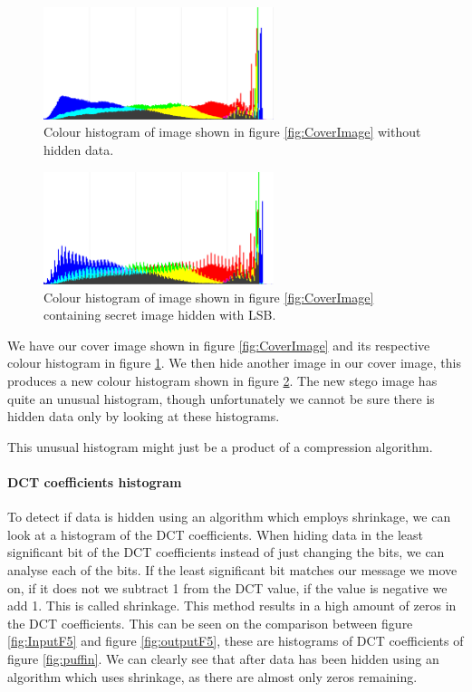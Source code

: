 \begin{figure}
	\centering
	\includegraphics[width=0.6\textwidth]{figures/HistoLSBCat.png}
	\caption{Colour histogram of image shown in figure \ref{fig:CoverImage} without hidden data.}
	\label{fig:HistoWithoutLSB}
\end{figure}

\begin{figure}
	\centering
	\includegraphics[width=0.6\textwidth]{figures/HistoLSBCatEncrypted.png}
	\caption{Colour histogram of image shown in figure \ref{fig:CoverImage} containing secret image hidden with LSB.}
	\label{fig:HistoWithLSB}
\end{figure}

We have our cover image shown in figure \ref{fig:CoverImage} and its respective colour histogram in figure \ref{fig:HistoWithoutLSB}.
We then hide another image in our cover image, this produces a new colour histogram shown in figure \ref{fig:HistoWithLSB}.
The new stego image has quite an unusual histogram, though unfortunately we cannot be sure there is hidden data only by looking at these histograms.

This unusual histogram might just be a product of a compression algorithm.

\paragraph*{DCT coefficients histogram}
To detect if data is hidden using an algorithm which employs shrinkage, we can look at a histogram of the DCT coefficients.
When hiding data in the least significant bit of the DCT coefficients instead of just changing the bits, we can analyse each of the bits.
If the least significant bit matches our message we move on, if it does not we subtract 1 from the DCT value, if the value is negative we add 1.
This is called shrinkage.
This method results in a high amount of zeros in the DCT coefficients.
This can be seen on the comparison between figure \ref{fig:InputF5} and figure \ref{fig:outputF5}, these are histograms of DCT coefficients of figure \ref{fig:puffin}.
We can clearly see that after data has been hidden using an algorithm which uses shrinkage, as there are almost only zeros remaining.

